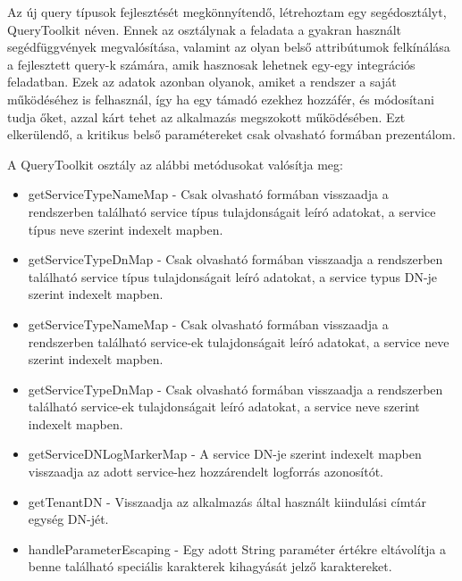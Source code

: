 Az új query típusok fejlesztését megkönnyítendő, létrehoztam egy segédosztályt, QueryToolkit néven. Ennek az osztálynak a feladata a gyakran használt segédfüggvények megvalósítása, valamint az olyan belső attribútumok felkínálása a fejlesztett query-k számára, amik hasznosak lehetnek egy-egy integrációs feladatban. Ezek az adatok azonban olyanok, amiket a rendszer a saját működéséhez is felhasznál, így ha egy támadó ezekhez hozzáfér, és módosítani tudja őket, azzal kárt tehet az alkalmazás megszokott működésében. Ezt elkerülendő, a kritikus belső paramétereket csak olvasható formában prezentálom.

A QueryToolkit osztály az alábbi metódusokat valósítja meg:

\begin{itemize}
	\item getServiceTypeNameMap - Csak olvasható formában visszaadja a rendszerben található service típus tulajdonságait leíró adatokat, a service típus neve szerint indexelt mapben.
	\item getServiceTypeDnMap - Csak olvasható formában visszaadja a rendszerben található service típus tulajdonságait leíró adatokat, a service typus DN-je szerint indexelt mapben.
	\item getServiceTypeNameMap - Csak olvasható formában visszaadja a rendszerben található service-ek tulajdonságait leíró adatokat, a service neve szerint indexelt mapben.
	\item getServiceTypeDnMap - Csak olvasható formában visszaadja a rendszerben található service-ek tulajdonságait leíró adatokat, a service neve szerint indexelt mapben.
	\item getServiceDNLogMarkerMap - A service DN-je szerint indexelt mapben visszaadja az adott service-hez hozzárendelt logforrás azonosítót.
	\item getTenantDN - Visszaadja az alkalmazás által használt kiindulási címtár egység DN-jét.
	\item handleParameterEscaping - Egy adott String paraméter értékre eltávolítja a benne található speciális karakterek kihagyását jelző karaktereket.
\end{itemize}

